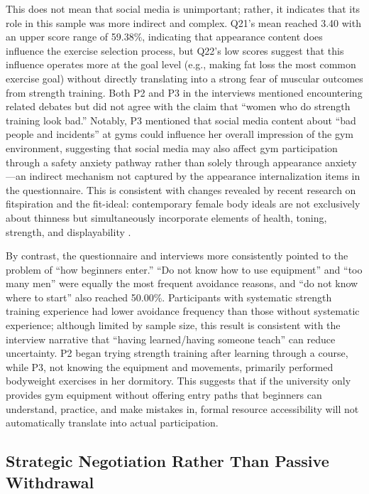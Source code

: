 This does not mean that social media is unimportant; rather, it indicates that its role in this sample was more indirect and complex.
Q21's mean reached 3.40 with an upper score range of 59.38\%, indicating that appearance content does influence the exercise selection process, but Q22's low scores suggest that this influence operates more at the goal level (e.g., making fat loss the most common exercise goal) without directly translating into a strong fear of muscular outcomes from strength training.
Both P2 and P3 in the interviews mentioned encountering related debates but did not agree with the claim that ``women who do strength training look bad.''
Notably, P3 mentioned that social media content about ``bad people and incidents'' at gyms could influence her overall impression of the gym environment, suggesting that social media may also affect gym participation through a safety anxiety pathway rather than solely through appearance anxiety---an indirect mechanism not captured by the appearance internalization items in the questionnaire.
This is consistent with changes revealed by recent research on fitspiration and the fit-ideal: contemporary female body ideals are not exclusively about thinness but simultaneously incorporate elements of health, toning, strength, and displayability \parencite{tiggemann2015fitspiration,donovan2020fitideal}.

By contrast, the questionnaire and interviews more consistently pointed to the problem of ``how beginners enter.''
``Do not know how to use equipment'' and ``too many men'' were equally the most frequent avoidance reasons, and ``do not know where to start'' also reached 50.00\%.
Participants with systematic strength training experience had lower avoidance frequency than those without systematic experience; although limited by sample size, this result is consistent with the interview narrative that ``having learned/having someone teach'' can reduce uncertainty.
P2 began trying strength training after learning through a course, while P3, not knowing the equipment and movements, primarily performed bodyweight exercises in her dormitory.
This suggests that if the university only provides gym equipment without offering entry paths that beginners can understand, practice, and make mistakes in, formal resource accessibility will not automatically translate into actual participation.

\subsection{Strategic Negotiation Rather Than Passive Withdrawal}

